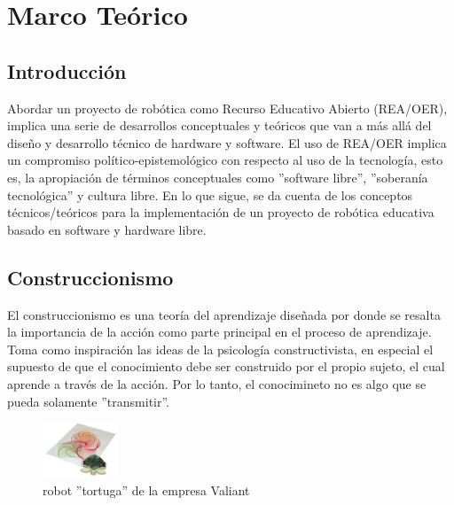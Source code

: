 
\chapter{Marco Teórico}

\section{Introducción}

Abordar un proyecto de robótica como Recurso Educativo Abierto (REA/OER), implica una serie de desarrollos conceptuales y teóricos que van a más allá del diseño y desarrollo técnico de hardware y software. El uso de REA/OER \citep{montoya2012recursos} implica un compromiso político-epistemológico con respecto al uso de la tecnología, esto es, la apropiación de términos conceptuales como ''software libre'', ''soberanía tecnológica'' y cultura libre. En lo que sigue, se da cuenta de los conceptos técnicos/teóricos para  la implementación de un proyecto de robótica educativa basado en software y hardware libre.

\section{Construccionismo}

El construccionismo es una teoría del aprendizaje diseñada por \cite{seymour_papert_desafio_1987} donde se resalta la importancia de la acción como parte principal en el proceso de aprendizaje. Toma como inspiración las ideas de la psicología constructivista, en especial el supuesto de que el conocimiento debe ser construido por el propio sujeto, el cual aprende a través de la acción. Por lo tanto, el conocimineto no es algo que se pueda solamente ''transmitir''.

\begin{figure}[htb]
  \begin{center}
    \includegraphics[width=0.2\textwidth]{figuras/Turtle_draw.jpg}
    \caption[Caption for LOF]{robot ''tortuga'' de la empresa Valiant}
    
    \label{fig:turtle }
  \end{center}
\end{figure}


